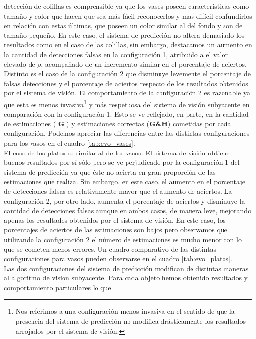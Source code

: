 detección de colillas es comprensible ya que los vasos poseen 
características como tamaño y color que hacen que sea más fácil 
reconocerlos y mas difícil confundirlos en relación con estas 
últimas, que poseen un color similar al del fondo y son de tamaño 
pequeño. En este caso, el sistema de predicción no altera demasiado 
los resultados como en el caso de las colillas, sin embargo, destacamos un 
aumento en la cantidad de detecciones falsas en la configuración 1, 
atribuido a el valor elevado de $\rho$, acompañado de un incremento 
similar en el porcentaje de aciertos. Distinto es el caso de 
la configuración 2 que disminuye levemente el porcentaje de falsas 
detecciones y el porcentaje de aciertos respecto de los resultados
obtenidos por el sistema de visión. El comportamiento de la 
configuración 2 es razonable ya que esta es menos 
invasiva\footnote{Nos referimos a una configuración menos invasiva en 
el sentido de que la presencia del sistema de predicción no modifica 
drásticamente los resultados arrojados por el sistema de visión.} y más respetuosa del sistema de visión subyacente en 
comparación con la configuración 1. Esto se ve reflejado, en parte, 
en la cantidad de estimaciones ( \textbf{G} ) y estimaciones correctas 
(\textbf{G\&H}) cometidas por cada configuración. Podemos 
apreciar las diferencias entre las distintas configuraciones para los 
vasos en el cuadro \ref{tab:evo_vasos}.\\
\indent El caso de los platos es similar al de los vasos. El sistema de visión 
obtiene buenos resultados por sí sólo pero se ve perjudicado por la configuración 1 del sistema de 
predicción ya que éste no acierta en gran proporción de las estimaciones que realiza. 
Sin embargo, en este caso, el aumento en el porcentaje de detecciones 
falsas es relativamente mayor que el aumento de aciertos. 
La configuración 2, por otro lado, aumenta el 
porcentaje de aciertos y disminuye la cantidad de detecciones falsas 
aunque en ambos casos, de manera leve, mejorando apenas los resultados 
obtenidos por el sistema de visión. En este caso, los porcentajes de 
aciertos de las estimaciones son bajos pero observamos que utilizando 
la configuración 2 el número de estimaciones es mucho menor con lo 
que se cometen menos errores. Un cuadro comparativo de las 
distintas configuraciones para vasos pueden observarse en el cuadro 
\ref{tab:evo_platos}.\\
\indent  Las dos configuraciones del sistema de predicción modifican de 
distintas maneras al algoritmo de visión subyacente. Para cada objeto 
hemos obtenido resultados y comportamiento particulares lo que 
